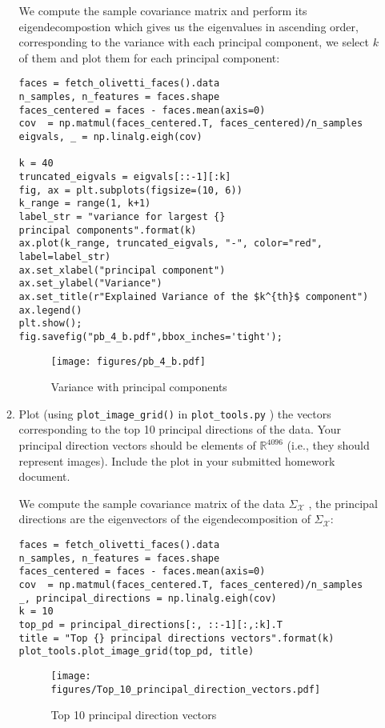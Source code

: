 \documentclass[12pt,twoside]{article}
\begin{document}
\begin{enumerate}
\begin{enumerate}
We compute the sample covariance matrix and perform its eigendecompostion which gives us the eigenvalues in ascending order, corresponding to the variance with each principal component, we select $k$ of them
and plot them for each principal component:
\begin{verbatim}
faces = fetch_olivetti_faces().data
n_samples, n_features = faces.shape
faces_centered = faces - faces.mean(axis=0)
cov  = np.matmul(faces_centered.T, faces_centered)/n_samples
eigvals, _ = np.linalg.eigh(cov)

k = 40
truncated_eigvals = eigvals[::-1][:k]
fig, ax = plt.subplots(figsize=(10, 6))
k_range = range(1, k+1)
label_str = "variance for largest {} 
principal components".format(k)
ax.plot(k_range, truncated_eigvals, "-", color="red", 
label=label_str)
ax.set_xlabel("principal component")
ax.set_ylabel("Variance")
ax.set_title(r"Explained Variance of the $k^{th}$ component")
ax.legend()
plt.show();
fig.savefig("pb_4_b.pdf",bbox_inches='tight');
\end{verbatim}

	\begin{figure}[H]
		\centering
		\texttt{[image: figures/pb\_4\_b.pdf]}
		\caption{Variance with principal components}
		\label{fig6}
	\end{figure}

\item  Plot (using  \verb|plot_image_grid()| in
\verb|plot_tools.py| ) the vectors
corresponding to the top 10 principal directions of the data.
Your principal direction vectors should be elements of $\mathbb{R}^{4096}$ (i.e., they
should represent images).
Include the plot in your submitted homework document.

We compute the sample covariance matrix of the data $\Sigma_{\mathcal{X}}$ ,
 the principal directions are the eigenvectors of the eigendecomposition of  $\Sigma_{\mathcal{X}}$:
 
\begin{verbatim} 
faces = fetch_olivetti_faces().data
n_samples, n_features = faces.shape
faces_centered = faces - faces.mean(axis=0)
cov  = np.matmul(faces_centered.T, faces_centered)/n_samples
_, principal_directions = np.linalg.eigh(cov)
k = 10
top_pd = principal_directions[:, ::-1][:,:k].T
title = "Top {} principal directions vectors".format(k)
plot_tools.plot_image_grid(top_pd, title)
\end{verbatim}

	\begin{figure}[H]
		\centering
		\texttt{[image: figures/Top\_10\_principal\_direction\_vectors.pdf]}
		\caption{Top 10 principal direction vectors}
		\label{fig7}
	\end{figure}



\end{enumerate}
\end{enumerate}
\end{document}
